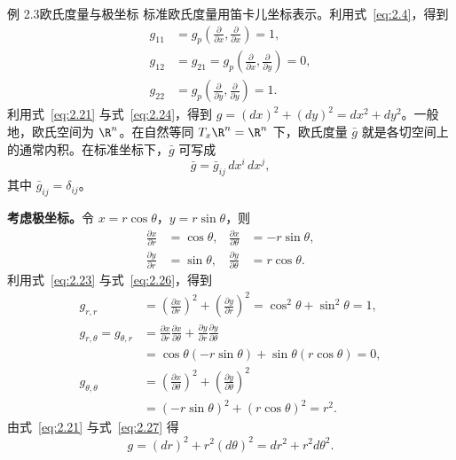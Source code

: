 \begin{statement}{例 2.3}{欧氏度量与极坐标}
标准欧氏度量用笛卡儿坐标表示。利用式~\eqref{eq:2.4}，得到
\begin{equation*}
  \begin{aligned}
    g_{11}&=g_p\!\left(\frac{\partial}{\partial x},\frac{\partial}{\partial x}\right)=1,\\
    g_{12}&=g_{21}=g_p\!\left(\frac{\partial}{\partial x},\frac{\partial}{\partial y}\right)=0,\\
    g_{22}&=g_p\!\left(\frac{\partial}{\partial y},\frac{\partial}{\partial y}\right)=1.
  \end{aligned}
  \tag{2.24}\label{eq:2.24}
\end{equation*}
利用式~\eqref{eq:2.21} 与式~\eqref{eq:2.24}，得到 $g=(dx)^2+(dy)^2=dx^2+dy^2$。一般地，欧氏空间为 $\R^n$。在自然等同 $T_x\R^n=\R^n$ 下，欧氏度量 $\bar g$ 就是各切空间上的通常内积。在标准坐标下，$\bar g$ 可写成
\begin{equation*}
  \bar g=\bar g_{ij}\,dx^i\,dx^j,
  \tag{2.25}\label{eq:2.25}
\end{equation*}
其中 $\bar g_{ij}=\delta_{ij}$。

\textbf{考虑极坐标。}令 $x=r\cos\theta$，$y=r\sin\theta$，则
\begin{equation*}
  \begin{aligned}
    \frac{\partial x}{\partial r}&=\cos\theta,&
    \frac{\partial x}{\partial\theta}&=-r\sin\theta,\\
    \frac{\partial y}{\partial r}&=\sin\theta,&
    \frac{\partial y}{\partial\theta}&=r\cos\theta.
  \end{aligned}
  \tag{2.26}\label{eq:2.26}
\end{equation*}
利用式~\eqref{eq:2.23} 与式~\eqref{eq:2.26}，得到
\begin{equation*}
  \begin{aligned}
    g_{r,r}
      &=\left(\frac{\partial x}{\partial r}\right)^2
        +\left(\frac{\partial y}{\partial r}\right)^2
        =\cos^2\theta+\sin^2\theta=1,\\
    g_{r,\theta}=g_{\theta,r}
      &=\frac{\partial x}{\partial r}\frac{\partial x}{\partial\theta}
        +\frac{\partial y}{\partial r}\frac{\partial y}{\partial\theta}\\
      &=\cos\theta(-r\sin\theta)+\sin\theta(r\cos\theta)=0,\\
    g_{\theta,\theta}
      &=\left(\frac{\partial x}{\partial\theta}\right)^2
        +\left(\frac{\partial y}{\partial\theta}\right)^2\\
      &=(-r\sin\theta)^2+(r\cos\theta)^2=r^2.
  \end{aligned}
  \tag{2.27}\label{eq:2.27}
\end{equation*}
由式~\eqref{eq:2.21} 与式~\eqref{eq:2.27} 得
\begin{equation*}
  g=(dr)^2+r^2(d\theta)^2=dr^2+r^2d\theta^2.
  \tag{2.28}\label{eq:2.28}
\end{equation*}
\end{statement}


